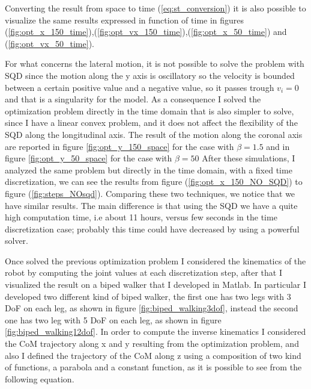 \documentclass[a4paper]{article}
\begin{document}

Converting the result from space to time (\ref{eq:st_conversion}) it is also possible to visualize the same results expressed in function of time in figures (\ref{fig:opt_x_150_time}),(\ref{fig:opt_vx_150_time}),(\ref{fig:opt_x_50_time}) and (\ref{fig:opt_vx_50_time}).

For what concerns the lateral motion, it is not possible to solve the problem with SQD since the motion along the y axis is oscillatory so  the velocity is bounded between a certain positive value  and a negative value, so it passes trough $v_i=0$ and that is a singularity for the model. As a consequence I solved the optimization problem directly in the time domain that is also simpler to solve, since I have a linear convex problem, and it does not affect the flexibility of the SQD along the longitudinal axis. The result of the motion along the coronal axis are reported in figure \ref{fig:opt_y_150_space} for the case with $\beta = 1.5$ and in figure \ref{fig:opt_y_50_space} for the case with $\beta = 50$
After these simulations, I analyzed the same problem but directly in the time domain, with a fixed time discretization, we can see the results from figure (\ref{fig:opt_x_150_NO_SQD}) to figure (\ref{fig:steps_NOsqd}). Comparing these two techniques, we notice that we have similar results. The main difference is that using the SQD we have a  quite high computation time, i.e about 11 hours, versus few seconds in the time discretization case; probably this time could have decreased by using a powerful solver.

Once solved the previous optimization problem I considered the kinematics of the robot by computing the joint values at each discretization step, after that I visualized the result on a biped walker that I developed in Matlab. In particular I developed two different kind of biped walker, the first one has two legs with 3 DoF on each leg, as shown in figure \ref{fig:biped_walking3dof}, instead the second one has two leg with 5 DoF on each leg, as shown in figure \ref{fig:biped_walking12dof}. In order to compute the inverse kinematics I considered the CoM trajectory along x and y resulting from the optimization problem, and also I defined the trajectory of the CoM along z using a composition of two kind of functions, a parabola and a constant function, as it is possible to see from the following equation.
\end{document}
